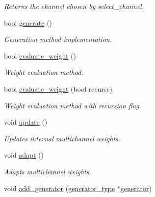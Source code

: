 \begin{DoxyCompactItemize}
\begin{DoxyCompactList}\small\item\em Returns the channel chosen by select\+\_\+channel. \end{DoxyCompactList}\item 
\hypertarget{a00379_ae47b19549d982e49894e5a22599eb742}{}bool \hyperlink{a00379_ae47b19549d982e49894e5a22599eb742}{generate} ()\label{a00379_ae47b19549d982e49894e5a22599eb742}

\begin{DoxyCompactList}\small\item\em Generation method implementation. \end{DoxyCompactList}\item 
\hypertarget{a00379_a6c15fa2eef9d33c9b665ce44462e8bf1}{}bool \hyperlink{a00379_a6c15fa2eef9d33c9b665ce44462e8bf1}{evaluate\+\_\+weight} ()\label{a00379_a6c15fa2eef9d33c9b665ce44462e8bf1}

\begin{DoxyCompactList}\small\item\em Weight evaluation method. \end{DoxyCompactList}\item 
\hypertarget{a00379_a9cdb594ead0652a5c3c8b67ab54353bc}{}bool \hyperlink{a00379_a9cdb594ead0652a5c3c8b67ab54353bc}{evaluate\+\_\+weight} (bool recurse)\label{a00379_a9cdb594ead0652a5c3c8b67ab54353bc}

\begin{DoxyCompactList}\small\item\em Weight evaluation method with recursion flag. \end{DoxyCompactList}\item 
\hypertarget{a00379_aaa4efcbda0705e575e1e8864de8bf08c}{}void \hyperlink{a00379_aaa4efcbda0705e575e1e8864de8bf08c}{update} ()\label{a00379_aaa4efcbda0705e575e1e8864de8bf08c}

\begin{DoxyCompactList}\small\item\em Updates internal multichannel weights. \end{DoxyCompactList}\item 
\hypertarget{a00379_a050eecf19eadf81db8d9e2faefd4e302}{}void \hyperlink{a00379_a050eecf19eadf81db8d9e2faefd4e302}{adapt} ()\label{a00379_a050eecf19eadf81db8d9e2faefd4e302}

\begin{DoxyCompactList}\small\item\em Adapts multichannel weights. \end{DoxyCompactList}\item 
\hypertarget{a00379_a140d5ac974ad3336afd20401c1f2856d}{}void \hyperlink{a00379_a140d5ac974ad3336afd20401c1f2856d}{add\+\_\+generator} (\hyperlink{a00366}{generator\+\_\+type} $\ast$\hyperlink{a00379_adf7372bbbcd347dde1ee06ee3dfd9242}{generator})\label{a00379_a140d5ac974ad3336afd20401c1f2856d}


\end{DoxyCompactItemize}
